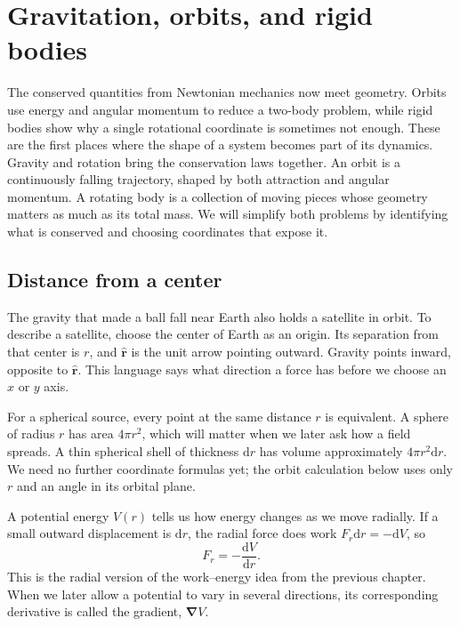 \documentclass[11pt,oneside]{book}
\newcommand{\dd}{\mathrm{d}}
\newcommand{\vect}[1]{\boldsymbol{#1}}
\newcommand{\grad}{\boldsymbol{\nabla}}
\newcommand{\od}[2]{\frac{\dd #1}{\dd #2}}
\theoremstyle{reviewstyle}
\begin{document}
\chapter{Gravitation, orbits, and rigid bodies}
The conserved quantities from Newtonian mechanics now meet geometry. Orbits use energy and angular momentum to reduce a two-body problem, while rigid bodies show why a single rotational coordinate is sometimes not enough. These are the first places where the shape of a system becomes part of its dynamics.
Gravity and rotation bring the conservation laws together. An orbit is a continuously falling trajectory, shaped by both attraction and angular momentum. A rotating body is a collection of moving pieces whose geometry matters as much as its total mass. We will simplify both problems by identifying what is conserved and choosing coordinates that expose it.

\section{Distance from a center}
The gravity that made a ball fall near Earth also holds a satellite in orbit. To describe a satellite, choose the center of Earth as an origin. Its separation from that center is $r$, and $\hat{\vect r}$ is the unit arrow pointing outward. Gravity points inward, opposite to $\hat{\vect r}$. This language says what direction a force has before we choose an $x$ or $y$ axis.

For a spherical source, every point at the same distance $r$ is equivalent. A sphere of radius $r$ has area $4\pi r^2$, which will matter when we later ask how a field spreads. A thin spherical shell of thickness $\dd r$ has volume approximately $4\pi r^2\dd r$. We need no further coordinate formulas yet; the orbit calculation below uses only $r$ and an angle in its orbital plane.

A potential energy $V(r)$ tells us how energy changes as we move radially. If a small outward displacement is $\dd r$, the radial force does work $F_r\dd r=-\dd V$, so
\begin{equation}
F_r=-\od{V}{r}.
\end{equation}
This is the radial version of the work--energy idea from the previous chapter. When we later allow a potential to vary in several directions, its corresponding derivative is called the gradient, $\grad V$.
\end{document}
